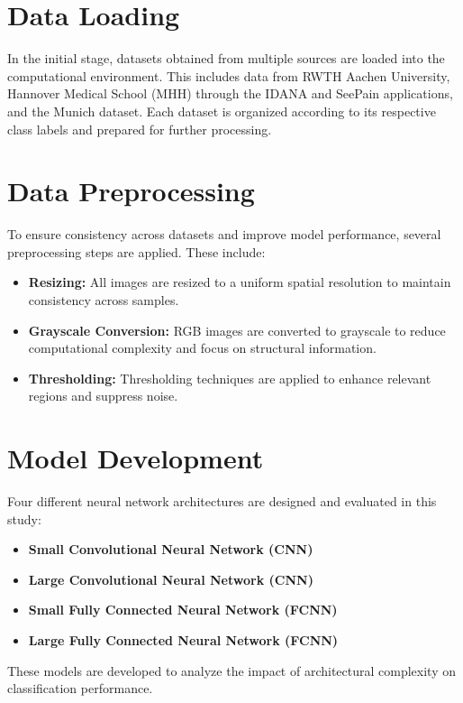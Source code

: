 \documentclass[12pt]{report}
\begin{document}
\section{Data Loading}

In the initial stage, datasets obtained from multiple sources are loaded into the computational environment. This includes data from RWTH Aachen University, Hannover Medical School (MHH) through the IDANA and SeePain applications, and the Munich dataset. Each dataset is organized according to its respective class labels and prepared for further processing.

\section{Data Preprocessing}

To ensure consistency across datasets and improve model performance, several preprocessing steps are applied. These include:

\begin{itemize}
	\item \textbf{Resizing:} All images are resized to a uniform spatial resolution to maintain consistency across samples.
	\item \textbf{Grayscale Conversion:} RGB images are converted to grayscale to reduce computational complexity and focus on structural information.
	\item \textbf{Thresholding:} Thresholding techniques are applied to enhance relevant regions and suppress noise.
\end{itemize}

\section{Model Development}

Four different neural network architectures are designed and evaluated in this study:

\begin{itemize}
	\item \textbf{Small Convolutional Neural Network (CNN)}
	\item \textbf{Large Convolutional Neural Network (CNN)}
	\item \textbf{Small Fully Connected Neural Network (FCNN)}
	\item \textbf{Large Fully Connected Neural Network (FCNN)}
\end{itemize}

These models are developed to analyze the impact of architectural complexity on classification performance.
\end{document}
